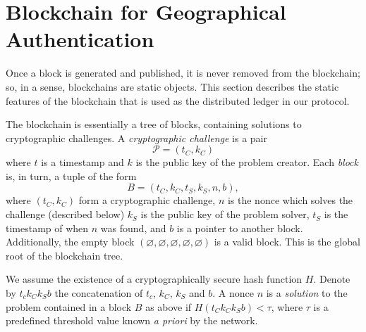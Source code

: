 \section{Blockchain for Geographical Authentication}
\label{sec:blockchain}

Once a block is generated and published,
it is never removed from the blockchain;
so, in a sense,
blockchains are static objects.
This section describes the static features of the blockchain
that is used as the distributed ledger in our protocol.

The blockchain is essentially a tree of blocks,
containing solutions to cryptographic challenges.
A \emph{cryptographic challenge} is a pair
\begin{equation*}
	\mathcal P = (t_C, k_C)
\end{equation*}
where $t$ is a timestamp and $k$ is the public key of the problem creator.
Each \emph{block} is, in turn, a tuple of the form
\begin{equation*}
	B = (t_C, k_C, t_S, k_S, n, b),
\end{equation*}
where $(t_C, k_C)$ form a cryptographic challenge,
$n$ is the nonce which solves the challenge (described below)
$k_S$ is the public key of the problem solver,
$t_S$ is the timestamp of when $n$ was found,
and $b$ is a pointer to another block.
Additionally,
the empty block $(\varnothing, \varnothing, \varnothing, \varnothing, \varnothing)$
is a valid block.
This is the global root of the blockchain tree.

We assume the existence of a cryptographically secure hash function $H$.
Denote by $t_c k_C k_S b$ the concatenation of $t_c$, $k_C$, $k_S$ and $b$.
A nonce $n$ is a \emph{solution} to the problem contained in a block $B$ as above
if $H(t_C k_C k_S b) < \tau$,
where $\tau$ is a predefined threshold value known \emph{a priori} by the network.


